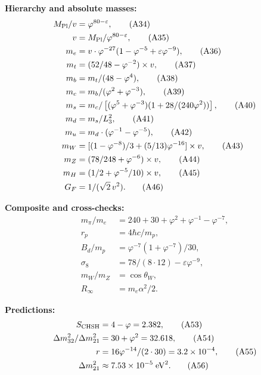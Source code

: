 \documentclass[aps,prd,twocolumn,superscriptaddress,nofootinbib,showpacs]{revtex4-2}
\newcommand{\Mpl}{M_{\rm Pl}}
\begin{document}
\textbf{Hierarchy and absolute masses:}
\begin{align}
\Mpl/v &= \varphi^{80-\varepsilon},
\tag{A34}\label{eq:A34} \\
v &= \Mpl/\varphi^{80-\varepsilon},
\tag{A35}\label{eq:A35} \\
m_e &= v\cdot\varphi^{-27}(1-\varphi^{-5}+\varepsilon\varphi^{-9}),
\tag{A36}\label{eq:A36} \\
m_t &= (52/48-\varphi^{-2})\times v,
\tag{A37}\label{eq:A37} \\
m_b &= m_t/(48-\varphi^4),
\tag{A38}\label{eq:A38} \\
m_c &= m_b/(\varphi^2+\varphi^{-3}),
\tag{A39}\label{eq:A39} \\
m_s &= m_c/\left[(\varphi^5+\varphi^{-3})(1+28/(240\varphi^2))\right],
\tag{A40}\label{eq:A40} \\
m_d &= m_s/L_3^2,
\tag{A41}\label{eq:A41} \\
m_u &= m_d\cdot(\varphi^{-1}-\varphi^{-5}),
\tag{A42}\label{eq:A42} \\
m_W &= [(1-\varphi^{-8})/3 + (5/13)\varphi^{-16}] \times v,
\tag{A43}\label{eq:A43} \\
m_Z &= (78/248+\varphi^{-6})\times v,
\tag{A44}\label{eq:A44} \\
m_H &= (1/2+\varphi^{-5}/10)\times v,
\tag{A45}\label{eq:A45} \\
G_F &= 1/(\sqrt{2}\,v^2).
\tag{A46}\label{eq:A46}
\end{align}

\textbf{Composite and cross-checks:}
\begin{align}
m_\pi/m_e &= 240+30+\varphi^2+\varphi^{-1}-\varphi^{-7},
\tag{A47}\label{eq:A47} \\
r_p &= 4\hbar c/m_p,
\tag{A48}\label{eq:A48} \\
B_d/m_p &= \varphi^{-7}(1+\varphi^{-7})/30,
\tag{A49}\label{eq:A49} \\
\sigma_8 &= 78/(8\cdot12) - \varepsilon\varphi^{-9},
\tag{A50}\label{eq:A50} \\
m_W/m_Z &= \cos\theta_W,
\tag{A51}\label{eq:A51} \\
R_\infty &= m_e\alpha^2/2.
\tag{A52}\label{eq:A52}
\end{align}

\textbf{Predictions:}
\begin{align}
S_{\rm CHSH} &= 4 - \varphi = 2.382,
\tag{A53}\label{eq:A53} \\
\Delta m^2_{32}/\Delta m^2_{21} &= 30 + \varphi^2 = 32.618,
\tag{A54}\label{eq:A54} \\
r &= 16\varphi^{-14}/(2\cdot 30) = 3.2\times10^{-4},
\tag{A55}\label{eq:A55} \\
\Delta m^2_{21} &\approx 7.53\times10^{-5}\;\text{eV}^2.
\tag{A56}\label{eq:A56}
\end{align}
\end{document}
